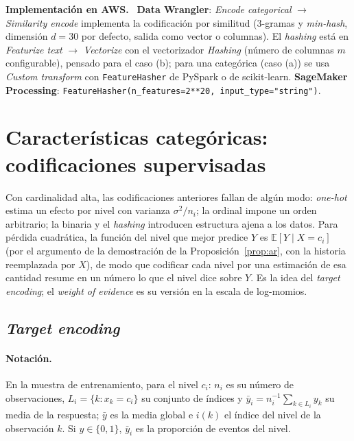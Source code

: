 \documentclass[11pt,a4paper]{article}
\theoremstyle{plain}
\theoremstyle{definition}
\theoremstyle{remark}
\newcommand{\E}{\mathbb{E}}
\newcommand{\1}{\mathbf{1}}
\newenvironment{aws}{\par\medskip\sloppy\noindent\textbf{Implementación en AWS.}\ }{\par\medskip}
\begin{document}
\begin{aws}
\textbf{Data Wrangler}: \emph{Encode categorical} $\to$ \emph{Similarity
encode} implementa la codificación por similitud (3-gramas y
\emph{min-hash}, dimensión $d=30$ por defecto, salida como vector o
columnas). El \emph{hashing} está en \emph{Featurize text} $\to$
\emph{Vectorize} con el vectorizador \emph{Hashing} (número de columnas
$m$ configurable), pensado para el caso (b); para una categórica (caso
(a)) se usa \emph{Custom transform} con \texttt{FeatureHasher} de PySpark o
de scikit-learn. \textbf{SageMaker Processing}:
\texttt{FeatureHasher(n\_features=2**20, input\_type="string")}.
\end{aws}

\section{Características categóricas: codificaciones supervisadas}

Con cardinalidad alta, las codificaciones anteriores fallan de algún modo:
\emph{one-hot} estima un efecto por nivel con varianza $\sigma^2/n_i$; la
ordinal impone un orden arbitrario; la binaria y el \emph{hashing}
introducen estructura ajena a los datos. Para pérdida cuadrática, la
función del nivel que mejor predice $Y$ es $\E[Y\mid X=c_i]$ (por el
argumento de la demostración de la Proposición~\ref{prop:ar}, con la
historia reemplazada por $X$), de modo que codificar cada nivel por una
estimación de esa cantidad resume en un número lo que el nivel dice sobre
$Y$. Es la idea del \emph{target encoding}; el \emph{weight of evidence}
es su versión en la escala de log-momios.

\subsection{\emph{Target encoding}}\label{sec:target}

\paragraph{Notación.} En la muestra de entrenamiento, para el nivel $c_i$:
$n_i$ es su número de observaciones, $L_i=\{k:x_k=c_i\}$ su conjunto de
índices y $\bar y_i=n_i^{-1}\sum_{k\in L_i}y_k$ su media de la respuesta;
$\bar y$ es la media global e $i(k)$ el índice del nivel de la
observación $k$. Si $y\in\{0,1\}$, $\bar y_i$ es la proporción de eventos
del nivel.
\end{document}

